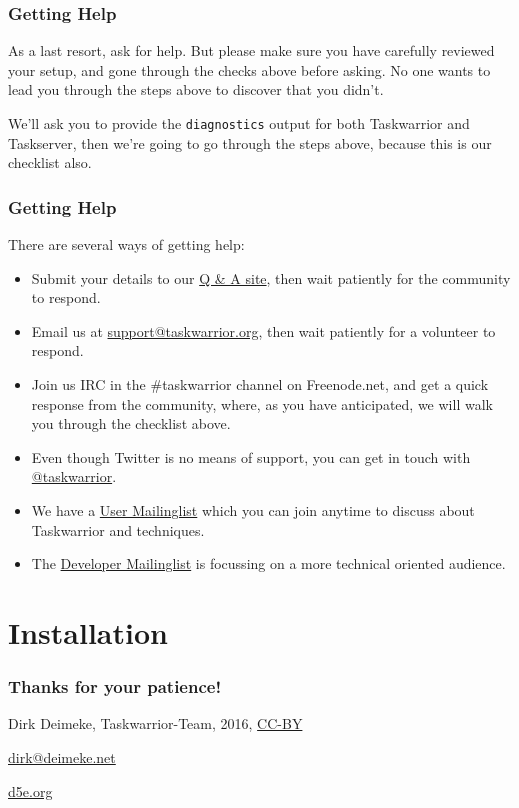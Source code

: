 \documentclass[t,handout]{beamer}
\begin{document}
\begin{frame}[fragile]\frametitle{Getting Help}
    As a last resort, ask for help. But please make sure you have carefully reviewed your setup, and gone through the checks above before asking. No one wants to lead you through the steps above to discover that you didn't.

    We'll ask you to provide the \verb+diagnostics+ output for both Taskwarrior and Taskserver, then we're going to go through the steps above, because this is our checklist also.
\end{frame}

\begin{frame}[fragile]\frametitle{Getting Help}
    There are several ways of getting help:

    \begin{itemize}
        \item Submit your details to our \href{https://answers.tasktools.org}{Q \& A site}, then wait patiently for the community to respond.
        \item Email us at \href{mailto:support@taskwarrior.org}{support@taskwarrior.org}, then wait patiently for a volunteer to respond.
        \item Join us IRC in the \#taskwarrior channel on Freenode.net, and get a quick response from the community, where, as you have anticipated, we will walk you through the checklist above.
        \item Even though Twitter is no means of support, you can get in touch with \href{https://twitter.com/taskwarrior}{@taskwarrior}.
        \item We have a \href{https://groups.google.com/forum/\#!forum/taskwarrior-user}{User Mailinglist} which you can join anytime to discuss about Taskwarrior and techniques.
        \item The \href{https://groups.google.com/forum/\#!forum/taskwarrior-dev}{Developer Mailinglist} is focussing on a more technical oriented audience.
    \end{itemize}

\end{frame}


\section{Installation}

\begin{frame}[fragile]\frametitle{Thanks for your patience!}
    \vfill
    \begin{center}
        Dirk Deimeke, Taskwarrior-Team, 2016, \href{https://creativecommons.org/licenses/by/4.0/}{CC-BY}

        \href{mailto:dirk@deimeke.net}{dirk@deimeke.net}

        \href{https://d5e.org/}{d5e.org}
    \end{center}
\end{frame}
\end{document}
